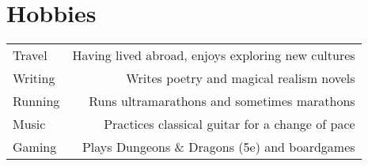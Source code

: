 \documentclass[letterpaper,11pt]{article}
\begin{document}
\section*{Hobbies}
\begin{longtable}{ @{} L @{} R @{} }
Travel		&	Having lived abroad, enjoys exploring new cultures\\
Writing		&	Writes poetry and magical realism novels\\
Running		&	Runs ultramarathons and sometimes marathons\\
Music		&	Practices classical guitar for a change of pace\\
Gaming		&	Plays Dungeons \& Dragons (5e) and boardgames

\end{longtable}
\end{document}
